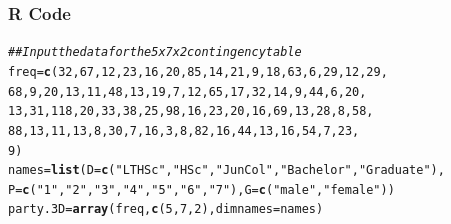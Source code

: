 \documentclass[oneside]{book}\usepackage[]{graphicx}\usepackage[svgnames]{xcolor}
\makeatletter
\newcommand{\hlnum}[1]{\textcolor[rgb]{0.686,0.059,0.569}{#1}}%
\newcommand{\hlstr}[1]{\textcolor[rgb]{0.192,0.494,0.8}{#1}}%
\newcommand{\hlcom}[1]{\textcolor[rgb]{0.678,0.584,0.686}{\textit{#1}}}%
\newcommand{\hlstd}[1]{\textcolor[rgb]{0.345,0.345,0.345}{#1}}%
\newcommand{\hlkwb}[1]{\textcolor[rgb]{0.69,0.353,0.396}{#1}}%
\newcommand{\hlkwc}[1]{\textcolor[rgb]{0.333,0.667,0.333}{#1}}%
\newcommand{\hlkwd}[1]{\textcolor[rgb]{0.737,0.353,0.396}{\textbf{#1}}}%
\newenvironment{kframe}{%
 \def\at@end@of@kframe{}%
 \ifinner\ifhmode%
  \def\at@end@of@kframe{\end{minipage}}%
  \begin{minipage}{\columnwidth}%
 \fi\fi%
 \def\FrameCommand##1{\hskip\@totalleftmargin \hskip-\fboxsep
 \colorbox{shadecolor}{##1}\hskip-\fboxsep
     \hskip-\linewidth \hskip-\@totalleftmargin \hskip\columnwidth}%
 \MakeFramed {\advance\hsize-\width
   \@totalleftmargin\z@ \linewidth\hsize
   \@setminipage}}%
 {\par\unskip\endMakeFramed%
 \at@end@of@kframe}
\newenvironment{knitrout}{}{} %
\makeatother
\begin{document}
\subsubsection*{R Code}
\begin{knitrout}
\color{fgcolor}\begin{kframe}
\begin{alltt}
\hlcom{## Input the data for the 5 x 7 x 2 contingency table}
\hlstd{freq} \hlkwb{=} \hlkwd{c}\hlstd{(}\hlnum{32}\hlstd{,} \hlnum{67}\hlstd{,} \hlnum{12}\hlstd{,} \hlnum{23}\hlstd{,} \hlnum{16}\hlstd{,} \hlnum{20}\hlstd{,} \hlnum{85}\hlstd{,} \hlnum{14}\hlstd{,} \hlnum{21}\hlstd{,} \hlnum{9}\hlstd{,} \hlnum{18}\hlstd{,} \hlnum{63}\hlstd{,} \hlnum{6}\hlstd{,} \hlnum{29}\hlstd{,} \hlnum{12}\hlstd{,} \hlnum{29}\hlstd{,}
  \hlnum{68}\hlstd{,} \hlnum{9}\hlstd{,} \hlnum{20}\hlstd{,} \hlnum{13}\hlstd{,} \hlnum{11}\hlstd{,} \hlnum{48}\hlstd{,} \hlnum{13}\hlstd{,} \hlnum{19}\hlstd{,} \hlnum{7}\hlstd{,} \hlnum{12}\hlstd{,} \hlnum{65}\hlstd{,} \hlnum{17}\hlstd{,} \hlnum{32}\hlstd{,} \hlnum{14}\hlstd{,} \hlnum{9}\hlstd{,} \hlnum{44}\hlstd{,} \hlnum{6}\hlstd{,} \hlnum{20}\hlstd{,}
  \hlnum{13}\hlstd{,} \hlnum{31}\hlstd{,} \hlnum{118}\hlstd{,} \hlnum{20}\hlstd{,} \hlnum{33}\hlstd{,} \hlnum{38}\hlstd{,} \hlnum{25}\hlstd{,} \hlnum{98}\hlstd{,} \hlnum{16}\hlstd{,} \hlnum{23}\hlstd{,} \hlnum{20}\hlstd{,} \hlnum{16}\hlstd{,} \hlnum{69}\hlstd{,} \hlnum{13}\hlstd{,} \hlnum{28}\hlstd{,} \hlnum{8}\hlstd{,} \hlnum{58}\hlstd{,}
  \hlnum{88}\hlstd{,} \hlnum{13}\hlstd{,} \hlnum{11}\hlstd{,} \hlnum{13}\hlstd{,} \hlnum{8}\hlstd{,} \hlnum{30}\hlstd{,} \hlnum{7}\hlstd{,} \hlnum{16}\hlstd{,} \hlnum{3}\hlstd{,} \hlnum{8}\hlstd{,} \hlnum{82}\hlstd{,} \hlnum{16}\hlstd{,} \hlnum{44}\hlstd{,} \hlnum{13}\hlstd{,} \hlnum{16}\hlstd{,} \hlnum{54}\hlstd{,} \hlnum{7}\hlstd{,} \hlnum{23}\hlstd{,}
  \hlnum{9}\hlstd{)}
\hlstd{names} \hlkwb{=} \hlkwd{list}\hlstd{(}\hlkwc{D} \hlstd{=} \hlkwd{c}\hlstd{(}\hlstr{"LT HSc"}\hlstd{,} \hlstr{"HSc"}\hlstd{,} \hlstr{"JunCol"}\hlstd{,} \hlstr{"Bachelor"}\hlstd{,} \hlstr{"Graduate"}\hlstd{),}
  \hlkwc{P} \hlstd{=} \hlkwd{c}\hlstd{(}\hlstr{"1"}\hlstd{,} \hlstr{"2"}\hlstd{,} \hlstr{"3"}\hlstd{,} \hlstr{"4"}\hlstd{,} \hlstr{"5"}\hlstd{,} \hlstr{"6"}\hlstd{,} \hlstr{"7"}\hlstd{),} \hlkwc{G} \hlstd{=} \hlkwd{c}\hlstd{(}\hlstr{"male"}\hlstd{,} \hlstr{"female"}\hlstd{))}
\hlstd{party.3D} \hlkwb{=} \hlkwd{array}\hlstd{(freq,} \hlkwd{c}\hlstd{(}\hlnum{5}\hlstd{,} \hlnum{7}\hlstd{,} \hlnum{2}\hlstd{),} \hlkwc{dimnames} \hlstd{= names)}

\end{alltt}
\end{kframe}
\end{knitrout}
\end{document}
